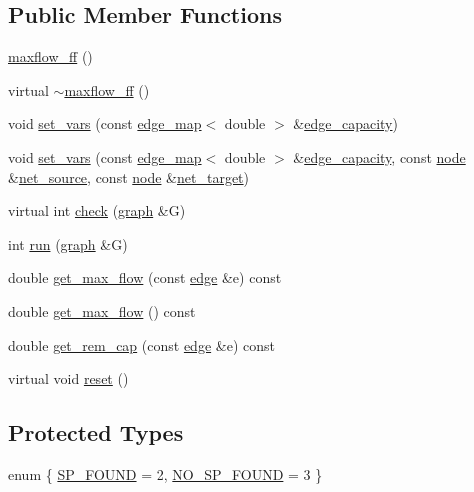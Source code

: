 \subsection*{Public Member Functions}
\begin{DoxyCompactItemize}
\item 
\mbox{\hyperlink{classmaxflow__ff_a6b1d3e5db46a8fcba81e94ad672926ec}{maxflow\+\_\+ff}} ()
\item 
virtual \mbox{\hyperlink{classmaxflow__ff_ae1c3c5ba0b8c55cdba429ee906bce7d9}{$\sim$maxflow\+\_\+ff}} ()
\item 
void \mbox{\hyperlink{classmaxflow__ff_ad2485a4c093dbcfa045d1e6e5d78f533}{set\+\_\+vars}} (const \mbox{\hyperlink{classedge__map}{edge\+\_\+map}}$<$ double $>$ \&\mbox{\hyperlink{classmaxflow__ff_a5b38943e093c77a57eb70f1a4190b8a6}{edge\+\_\+capacity}})
\item 
void \mbox{\hyperlink{classmaxflow__ff_a1e715030d70080e0c9ecf118dd81e8f6}{set\+\_\+vars}} (const \mbox{\hyperlink{classedge__map}{edge\+\_\+map}}$<$ double $>$ \&\mbox{\hyperlink{classmaxflow__ff_a5b38943e093c77a57eb70f1a4190b8a6}{edge\+\_\+capacity}}, const \mbox{\hyperlink{classnode}{node}} \&\mbox{\hyperlink{classmaxflow__ff_a2e4cc02ce8c9d929f2896525c686d6c1}{net\+\_\+source}}, const \mbox{\hyperlink{classnode}{node}} \&\mbox{\hyperlink{classmaxflow__ff_a94d5db73364cf5824ec3d3d530b57319}{net\+\_\+target}})
\item 
virtual int \mbox{\hyperlink{classmaxflow__ff_a4d0deee7d70bac4c9dad942341d87e37}{check}} (\mbox{\hyperlink{classgraph}{graph}} \&G)
\item 
int \mbox{\hyperlink{classmaxflow__ff_a0a4391b9093d6966b47c023a555099e2}{run}} (\mbox{\hyperlink{classgraph}{graph}} \&G)
\item 
double \mbox{\hyperlink{classmaxflow__ff_a4c120a7ea9be23d908036ebd2fb9298c}{get\+\_\+max\+\_\+flow}} (const \mbox{\hyperlink{classedge}{edge}} \&e) const
\item 
double \mbox{\hyperlink{classmaxflow__ff_a04d1ea509c13e500b62cad061ee8a2b9}{get\+\_\+max\+\_\+flow}} () const
\item 
double \mbox{\hyperlink{classmaxflow__ff_a3b66acf996ff5be94de8b2cfdb3164c3}{get\+\_\+rem\+\_\+cap}} (const \mbox{\hyperlink{classedge}{edge}} \&e) const
\item 
virtual void \mbox{\hyperlink{classmaxflow__ff_a893e5136d4f7f1d4b67ef5b67306d17b}{reset}} ()
\end{DoxyCompactItemize}
\subsection*{Protected Types}
\begin{DoxyCompactItemize}
\item 
enum \{ \mbox{\hyperlink{classmaxflow__ff_a08dc6e5c5fe20a9f9d93721f8c273592acf4f271b476cce9871e48ba446283d64}{S\+P\+\_\+\+F\+O\+U\+ND}} = 2, 
\mbox{\hyperlink{classmaxflow__ff_a08dc6e5c5fe20a9f9d93721f8c273592adc2a7638ed9e892fb272d6b9e1dda399}{N\+O\+\_\+\+S\+P\+\_\+\+F\+O\+U\+ND}} = 3
 \}
\end{DoxyCompactItemize}
